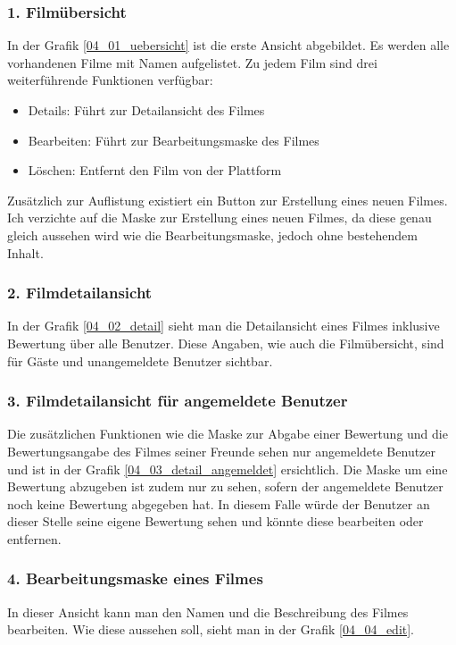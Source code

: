 \subsubsection{1. Filmübersicht}
In der Grafik \ref{04_01_uebersicht} ist die erste Ansicht abgebildet. Es werden
alle vorhandenen Filme mit Namen aufgelistet. Zu jedem Film sind drei weiterführende
Funktionen verfügbar:

\begin{itemize}
    \item Details: Führt zur Detailansicht des Filmes
    \item Bearbeiten: Führt zur Bearbeitungsmaske des Filmes
    \item Löschen: Entfernt den Film von der Plattform
\end{itemize}

Zusätzlich zur Auflistung existiert ein Button zur Erstellung eines neuen Filmes.
Ich verzichte auf die Maske zur Erstellung eines neuen Filmes, da diese genau gleich
aussehen wird wie die Bearbeitungsmaske, jedoch ohne bestehendem Inhalt.

\subsubsection{2. Filmdetailansicht}
In der Grafik \ref{04_02_detail} sieht man die Detailansicht eines Filmes inklusive Bewertung
über alle Benutzer. Diese Angaben, wie auch die Filmübersicht, sind für Gäste und
unangemeldete Benutzer sichtbar.

\subsubsection{3. Filmdetailansicht für angemeldete Benutzer}
Die zusätzlichen Funktionen wie die Maske zur Abgabe einer Bewertung und die Bewertungsangabe des Filmes 
seiner Freunde sehen nur angemeldete Benutzer und ist in der Grafik \ref{04_03_detail_angemeldet} 
ersichtlich. Die Maske um eine Bewertung abzugeben ist zudem nur zu sehen, sofern der angemeldete
Benutzer noch keine Bewertung abgegeben hat. In diesem Falle würde der Benutzer an dieser
Stelle seine eigene Bewertung sehen und könnte diese bearbeiten oder entfernen.

\subsubsection{4. Bearbeitungsmaske eines Filmes}
In dieser Ansicht kann man den Namen und die Beschreibung des Filmes bearbeiten.
Wie diese aussehen soll, sieht man in der Grafik \ref{04_04_edit}.


